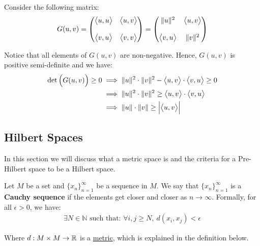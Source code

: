 \begin{proof*}
    Consider the following matrix:
    \begin{align*}
        G(u, v) = \begin{pmatrix}
            \big<u, u\big> & \big<u, v\big> 
            \\ \\
            \big<v, u\big> & \big<v, v\big>
        \end{pmatrix}
        =
        \begin{pmatrix}
            \|u\|^2 & \big<u, v\big> 
            \\ \\
            \big<v, u\big> & \|v\|^2
        \end{pmatrix}
    \end{align*}

    \noindent Notice that all elements of $G(u, v)$ are non-negative. Hence, $G(u, v)$ is positive semi-definite and we have:
    \begin{align*}
        \det\Big( G(u, v) \Big) \ge 0 &\implies \|u\|^2 \cdot \|v\|^2 - \big<u, v\big> \cdot \big<v, u\big> \ge 0 \\
        &\implies \|u\|^2 \cdot \|v\|^2 \ge \big<u, v\big> \cdot \big<v, u\big> \\
        &\implies \|u\| \cdot \|v\| \ge \Big| \big<u, v\big> \Big|
    \end{align*}
\end{proof*}



\subsection{Hilbert Spaces}
In this section we will discuss what a metric space is and the criteria for a Pre-Hilbert space to be a Hilbert space.

\begin{definition}
    Let $M$ be a set and $\{x_n\}_{n=1}^\infty$ be a sequence in $M$. We say that $\{x_n\}_{n=1}^\infty$ is a \textbf{Cauchy sequence} if the elements get closer and closer as $n\to\infty$. Formally, for all $\epsilon > 0$, we have:
    \begin{align*}
        \exists N \in \mathbb{N} \text{ such that: } \forall i, j \ge N, \ d(x_i, x_j) < \epsilon 
    \end{align*}

    \noindent Where $d: M \times M \to \mathbb{R}$ is a \underline{metric}, which is explained in the definition below.
\end{definition}


